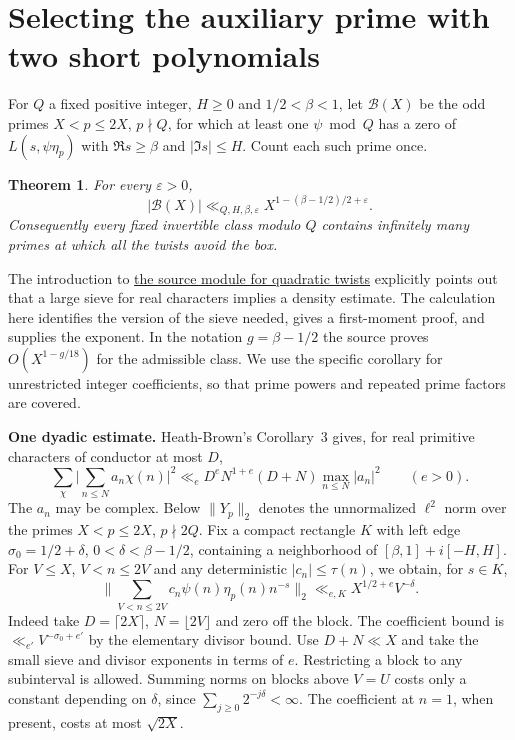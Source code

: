 \documentclass[11pt,letterpaper]{article}
\newtheorem{theorem}{Theorem}
\newcommand{\Source}[3]{\href{https://github.com/VladimirReshetnikov/ProveIt/blob/d8415e76ad850651f8c0083afe689dd9f4a45a10/Analysis/GeneralizedRiemannHypothesis/vendor/grh-lean/grh/src/#1.lean\#L#2}{#3}}
\newcommand{\sg}{\sigma_0}
\newcommand{\e}{\varepsilon}
\begin{document}
\section{Selecting the auxiliary prime with two short polynomials}\label{sec:selector}
For $Q$ a fixed positive integer, $H\ge0$ and $1/2<\beta<1$, let $\mathcal B(X)$ be the odd primes $X<p\le2X$, $p\nmid Q$, for which at least one $\psi\bmod Q$ has a zero of $L(s,\psi\eta_p)$ with $\Re s\ge\beta$ and $|\Im s|\le H$. Count each such prime once.
\begin{theorem}\label{th:selector}
For every $\e>0$,
\[
 |\mathcal B(X)|\ll_{Q,H,\beta,\e} X^{1-(\beta-1/2)/2+\e}.
\]
Consequently every fixed invertible class modulo $Q$ contains infinitely many primes at which all the twists avoid the box.
\end{theorem}
The introduction to \Source{Lib/Analytic/QuadraticTwist}{7}{the source module for quadratic twists} explicitly points out that a large sieve for real characters implies a density estimate. The calculation here identifies the version of the sieve needed, gives a first-moment proof, and supplies the exponent. In the notation $g=\beta-1/2$ the source proves $O(X^{1-g/18})$ for the admissible class. We use the specific corollary for unrestricted integer coefficients, so that prime powers and repeated prime factors are covered.

\textbf{One dyadic estimate.} Heath-Brown's Corollary~3 \cite{HB} gives, for real primitive characters of conductor at most $D$,
\[
 \sum_{\chi}\Big|\sum_{n\le N} a_n\chi(n)\Big|^2
 \ll_{e} D^e N^{1+e}(D+N)\max_{n\le N}|a_n|^2
 \qquad(e>0).
\]
The $a_n$ may be complex. Below $\|Y_p\|_2$ denotes the unnormalized $\ell^2$ norm over the primes $X<p\le 2X$, $p\nmid 2Q$. Fix a compact rectangle $K$ with left edge $\sg=1/2+\delta$, $0<\delta<\beta-1/2$, containing a neighborhood of $[\beta,1]+i[-H,H]$. For $V\le X$, $V<n\le2V$ and any deterministic $|c_n|\le\tau(n)$, we obtain, for $s\in K$,
\begin{equation}
 \bigg\|\sum_{V<n\le2V} c_n\psi(n)\eta_p(n)n^{-s}\bigg\|_2
      \ll_{e,K} X^{1/2+e} V^{-\delta}.\label{eq:block}
\end{equation}
Indeed take $D=\lceil 2X\rceil$, $N=\lfloor2V\rfloor$ and zero off the block. The coefficient bound is $\ll_{e'}V^{-\sg+e'}$ by the elementary divisor bound. Use $D+N\ll X$ and take the small sieve and divisor exponents in terms of $e$. Restricting a block to any subinterval is allowed. Summing norms on blocks above $V=U$ costs only a constant depending on $\delta$, since $\sum_{j\ge0}2^{-j\delta}<\infty$. The coefficient at $n=1$, when present, costs at most $\sqrt{2X}$.
\end{document}
